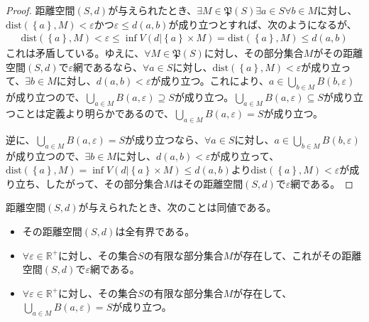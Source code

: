 \documentclass[dvipdfmx]{jsarticle}
\begin{document}
\begin{proof}
距離空間$(S,d)$が与えられたとき、$\exists M \in \mathfrak{P}(S)\exists a \in S\forall b \in M$に対し、$\mathrm{dist}\left( \left\{ a \right\},M \right) < \varepsilon$かつ$\varepsilon \leq d(a,b)$が成り立つとすれば、次のようになるが、
\begin{align*}
\mathrm{dist}\left( \left\{ a \right\},M \right) < \varepsilon \leq \inf{V\left( d|\left\{ a \right\} \times M \right)} = \mathrm{dist}\left( \left\{ a \right\},M \right) \leq d(a,b)
\end{align*}
これは矛盾している。ゆえに、$\forall M \in \mathfrak{P}(S)$に対し、その部分集合$M$がその距離空間$(S,d)$で$\varepsilon$網であるなら、$\forall a \in S$に対し、$\mathrm{dist}\left( \left\{ a \right\},M \right) < \varepsilon$が成り立って、$\exists b \in M$に対し、$d(a,b) < \varepsilon$が成り立つ。これにより、$a \in \bigcup_{b \in M} {B(b,\varepsilon)}$が成り立つので、$\bigcup_{a \in M} {B(a,\varepsilon)} \supseteq S$が成り立つ。$\bigcup_{a \in M} {B(a,\varepsilon)} \subseteq S$が成り立つことは定義より明らかであるので、$\bigcup_{a \in M} {B(a,\varepsilon)} = S$が成り立つ。\par
逆に、$\bigcup_{a \in M} {B(a,\varepsilon)} = S$が成り立つなら、$\forall a \in S$に対し、$a \in \bigcup_{b \in M} {B(b,\varepsilon)}$が成り立つので、$\exists b \in M$に対し、$d(a,b) < \varepsilon$が成り立って、$\mathrm{dist}\left( \left\{ a \right\},M \right) = \inf{V\left( d|\left\{ a \right\} \times M \right)} \leq d(a,b)$より$\mathrm{dist}\left( \left\{ a \right\},M \right) < \varepsilon$が成り立ち、したがって、その部分集合$M$はその距離空間$(S,d)$で$\varepsilon$網である。
\end{proof}
\begin{thm}\label{8.2.4.12}
距離空間$(S,d)$が与えられたとき、次のことは同値である。
\begin{itemize}
\item
  その距離空間$(S,d)$は全有界である。
\item
  $\forall\varepsilon \in \mathbb{R}^{+}$に対し、その集合$S$の有限な部分集合$M$が存在して、これがその距離空間$(S,d)$で$\varepsilon$網である。
\item
  $\forall\varepsilon \in \mathbb{R}^{+}$に対し、その集合$S$の有限な部分集合$M$が存在して、$\bigcup_{a \in M} {B(a,\varepsilon)} = S$が成り立つ。
\end{itemize}
\end{thm}
\end{document}
